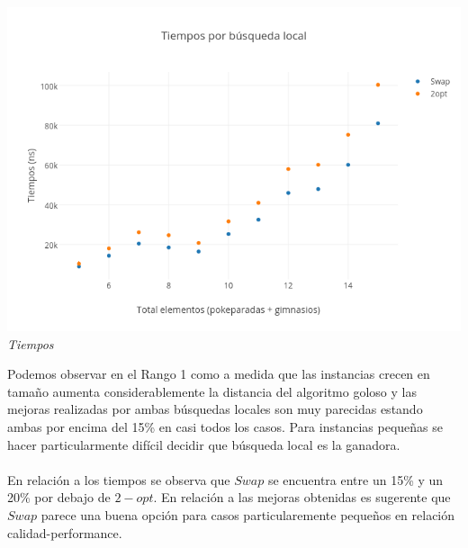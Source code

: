    \vspace*{0.3cm} \vspace*{0.3cm}
  \begin{center}
	\includegraphics[scale=0.50]{./EJ3/tiemposLocales20cuadM.png}
	\label{fig:gruposTiempos1}	
	\\{\textit{Tiempos}}
  \end{center}
  \vspace*{0.3cm} 

Podemos observar en el Rango 1 como a medida que las instancias crecen en tamaño aumenta considerablemente la distancia del algoritmo goloso y las mejoras realizadas por ambas búsquedas locales son muy parecidas estando ambas por encima del 15\% en casi todos los casos. Para instancias pequeñas se hacer particularmente difícil decidir que búsqueda local es la ganadora. 
\\\\

En relación a los tiempos se observa que $Swap$ se encuentra entre un 15\% y un 20\% por debajo de $2-opt$. En relación a las mejoras obtenidas es sugerente que $Swap$ parece una buena opción para casos particularemente pequeños en relación calidad-performance.
\\\\

